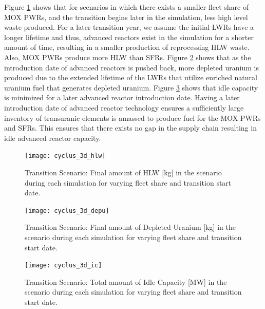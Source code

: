 Figure \ref{fig:cyclus_3d_hlw} shows that for scenarios in which 
there exists a smaller fleet share of \gls{MOX} \glspl{PWR}, and the 
transition begins later in the simulation, less high 
level waste produced. 
For a later transition year, we assume the initial 
\glspl{LWR} have a longer lifetime
and thus, advanced reactors exist in the simulation for a shorter 
amount of time, resulting in a smaller production of reprocessing 
HLW waste. 
Also, \gls{MOX} \glspl{PWR} produce more \gls{HLW} than \glspl{SFR}. 
Figure \ref{fig:cyclus_3d_depu} shows that as the introduction date 
of advanced reactors is pushed back, more depleted uranium is produced 
due to the extended lifetime of the \glspl{LWR} that utilize enriched 
natural uranium fuel that generates depleted uranium. 
Figure \ref{fig:cyclus_3d_ic} shows that idle capacity is minimized 
for a later advanced reactor introduction date. 
Having a later introduction date of advanced reactor technology ensures 
a sufficiently large inventory of transuranic elements is amassed
to produce fuel for the \gls{MOX} \glspl{PWR} and \glspl{SFR}.  
This ensures that there exists no gap in the supply chain resulting 
in idle advanced reactor capacity.

\begin{figure}[]
    \centering
    \texttt{[image: cyclus\_3d\_hlw]} 
    \caption{\Cyclus Transition Scenario: Final amount of HLW [kg] in the scenario during each simulation for varying fleet share and transition start date.}
    \label{fig:cyclus_3d_hlw}
\end{figure}

\begin{figure}[]
    \centering
    \texttt{[image: cyclus\_3d\_depu]} 
    \caption{\Cyclus Transition Scenario: Final amount of Depleted Uranium [kg] in the scenario during each simulation for varying fleet share and transition start date.}
    \label{fig:cyclus_3d_depu}
\end{figure}

\begin{figure}[]
    \centering
    \texttt{[image: cyclus\_3d\_ic]} 
    \caption{\Cyclus Transition Scenario: Total amount of Idle Capacity [MW] in the scenario during each simulation for varying fleet share and transition start date.}
    \label{fig:cyclus_3d_ic}
\end{figure}

